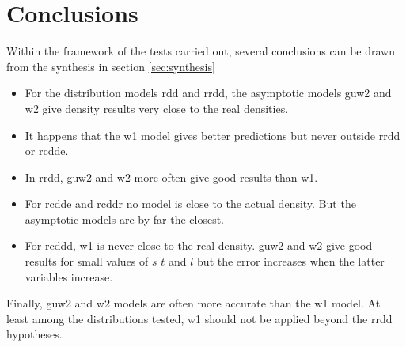 \section{Conclusions}

Within the framework of the tests carried out, several conclusions can be drawn from the synthesis in section \ref{sec:synthesis}

\begin{itemize}
\item For the distribution models \gls{rdd} and \gls{rrdd}, the asymptotic models \gls{guw2} and \gls{w2} give density results very close to the real densities.
\item It happens that the \gls{w1} model gives better predictions but never outside \gls{rrdd} or \gls{rcdde}.
\item In \gls{rrdd}, \gls{guw2} and \gls{w2} more often give good results than \gls{w1}.
\item For \gls{rcdde} and \gls{rcddr} no model is close to the actual density. But the asymptotic models are by far the closest.
\item For \gls{rcddd}, \gls{w1} is never close to the real density. \gls{guw2} and \gls{w2} give good results for small values of \( s \) \( t \) and \( l \) but the error increases when the latter variables increase.
\end{itemize}

Finally, \gls{guw2} and \gls{w2} models are often more accurate than the \gls{w1} model.
At least among the distributions tested, \gls{w1} should not be applied beyond the \gls{rrdd} hypotheses.
